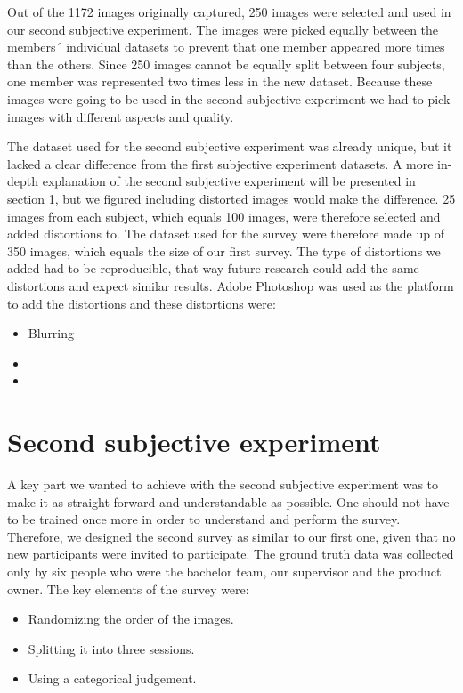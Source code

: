 Out of the 1172 images originally captured, 250 images were selected and used in our second subjective experiment. The images were picked equally between the members´ individual datasets to prevent that one member appeared more times than the others. Since 250 images cannot be equally split between four subjects, one member was represented two times less in the new dataset. Because these images were going to be used in the second subjective experiment we had to pick images with different aspects and quality. 

The dataset used for the second subjective experiment was already unique, but it lacked a clear difference from the first subjective experiment datasets. A more in-depth explanation of the second subjective experiment will be presented in section \ref{sec:secondse}, but we figured including distorted images would make the difference. 25 images from each subject, which equals 100 images, were therefore selected and added distortions to. The dataset used for the survey were therefore made up of 350 images, which equals the size of our first survey. The type of distortions we added had to be reproducible, that way future research could add the same distortions and expect similar results. Adobe Photoshop was used as the platform to add the distortions and these distortions were:

\begin{itemize}
    \item Blurring
    \item 
    \item 
\end{itemize}

\section{Second subjective experiment}
\label{sec:secondse}
A key part we wanted to achieve with the second subjective experiment was to make it as straight forward and understandable as possible. One should not have to be trained once more in order to understand and perform the survey. Therefore, we designed the second survey as similar to our first one, given that no new participants were invited to participate. The ground truth data was collected only by six people who were the bachelor team, our supervisor and the product owner. The key elements of the survey were: 
\begin{itemize}
    \item Randomizing the order of the images.
    \item Splitting it into three sessions. 
    \item Using a categorical judgement. 
\end{itemize}